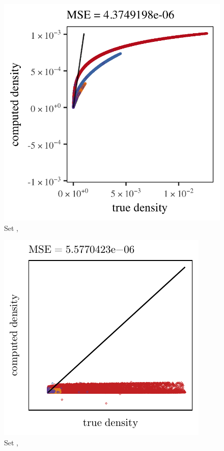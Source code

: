 \begin{subfigure}{0.23\textwidth}
	\centering
	\includegraphics[keepaspectratio=true, width=\textwidth, height=0.23\textheight]{4/img/results_ferdosi_3_120000_mbe_silverman.png}
	\caption{Set \ferdosiThree, \mbe}
	\label{fig:4:results:mbe:ferdosi3}
\end{subfigure}
\begin{subfigure}{0.23\textwidth}
	\centering
	\includegraphics[keepaspectratio=true, width=\textwidth, height=0.23\textheight]{4/img/results_ferdosi_3_120000_sambe_silverman}
	\caption{Set \ferdosiThree, \sambe}
	\label{fig:4:simulated:datasets:sambe:ferdosi3}
\end{subfigure}

